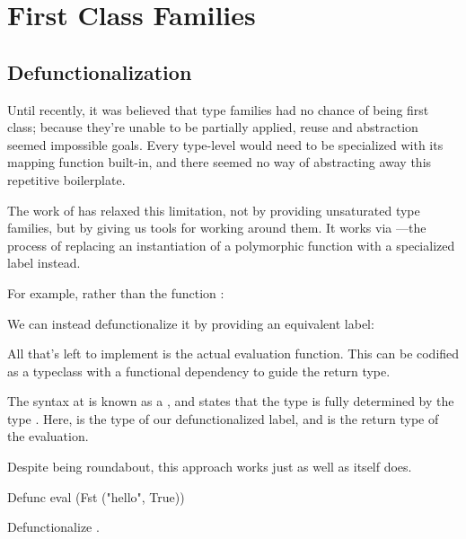 \documentclass[book.tex]{subfiles}
\begin{document}
\chapter{First Class Families}

\section{Defunctionalization}


Until recently, it was believed that type families had no chance of being first
class; because they're unable to be partially applied, reuse and abstraction
seemed impossible goals. Every type-level  would need to be specialized
with its mapping function built-in, and there seemed no way of abstracting away
this repetitive boilerplate.

The work of \lyxia{} \cite{fcf} has relaxed this limitation, not by providing
unsaturated type families, but by giving us tools for working around them. It
works via ---the process of
replacing an instantiation of a polymorphic function with a specialized label
instead.

For example, rather than the function :


We can instead defunctionalize it by providing an equivalent label:


All that's left to implement is the actual evaluation function. This can be
codified as a typeclass with a functional dependency to guide the return type.


The syntax  at  is known as a ,
and states that the type  is fully determined by the type . Here,
 is the type of our defunctionalized label, and  is the return type
of the evaluation.


Despite being roundabout, this approach works just as well as  itself
does.

\begin{dorepl}{Defunc}
eval (Fst ("hello", True))
\end{dorepl}

\begin{exercise}
Defunctionalize .
\end{exercise}
\begin{solution}
\end{solution}
\end{document}
